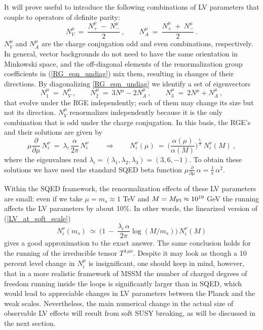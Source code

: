 \documentclass[12pt]{revtex4}
\begin{document}
It will prove useful to introduce the following combinations of 
LV parameters that couple to operators of definite parity:
\begin{equation}
\label{def_Nmu}
      N^\mu_V ~=~  \frac{ N_+^\mu ~-~ N_-^\mu }{2}~,   
\qquad 
      N^\mu_A ~=~  \frac{ N_+^\mu ~+~ N_-^\mu }{2}~.
\end{equation}
%
$N^\mu_V$ and $N^\mu_A$ are the charge conjugation odd and even
combinations, respectively. In general, vector backgrounds do not need
to have  the same orientation in Minkowski space, and the off-diagonal
elements of the renormalization group coefficients  in
(\ref{RG_eqn_undiag}) mix them, resulting in changes of their
directions.  By diagonalizing \eqref{RG_eqn_undiag} we identify a 
set of eigenvectors  
%
\begin{equation}
N_1^\mu ~=~ N^\mu_V~, 
\qquad 
N_2^\mu ~=~ 3 N^\mu - 2 N^\mu_A~,
\qquad 
N_3^\mu ~=~ 2 N^\mu + N^\mu_A~,
\end{equation} 
%
that evolve under the RGE independently; each of them may change its
size but not its direction. $N_V^\mu$ renormalizes independently
because it is the only combination that is odd under the charge
conjugation. 
In this basis, the RGE's and their solutions are given by 
\begin{equation} 
\mu \frac{\partial}{\partial\mu} \, N_i^\nu 
~=~ \lambda_i\, \frac { \alpha}{2 \pi} \, N_i^\nu~ 
\qquad \Rightarrow \qquad 
N_i^\nu(\mu) ~=~ 
\Big(  \frac {\alpha(\mu)}{\alpha(M)} \Big)^{\frac {\lambda_i}2} \, 
N_i^\nu(M)~, 
\label{LV_at_soft_scale}
\end{equation} 
where the eigenvalues read 
$\lambda_i = (\lambda_1, \lambda_2, \lambda_3) = (3, 6, -1)$. 
To obtain these solutions we have used the standard SQED beta function
\( 
\mu \frac{\partial}{\partial\mu} \, \alpha = \frac 1{\pi} \,
\alpha^2.  
\) 


Within the SQED framework, the renormalization effects of these LV
parameters are small: even if we take $\mu = m_{s} \approx 1$ TeV and
$M = M_{\rm Pl} \approx 10^{19}$ GeV the running affects the LV
parameters by about 10\%. In other words, the linearized version of
(\ref{LV_at_soft_scale})  
%
\begin{equation}
N_i^\nu(m_s) ~\simeq~ 
\Big(1~-~ \frac{\lambda_i\, \alpha}{2\pi}\log (M/m_s)
\Big)\, N_i^\nu(M)
\label{simplified}
\end{equation}
%
gives a good approximation to the exact answer. 
The same conclusion holds for the running of the
irreducible tensor $T^{\lambda\, \mu\nu}$. 
Despite it may look as though a 10 percent level change in $N_i^\mu$ is
insignificant, one should keep in mind, however, that in a more
realistic framework of MSSM the number of charged degrees of 
freedom running inside the loops is significantly larger than in SQED, 
which would lead to appreciable changes in LV parameters 
between the Planck and the weak scales. 
Nevertheless, the main numerical
change in the actual size of observable LV effects will result from
soft SUSY breaking, as will be discussed in the next section. 
\end{document}
